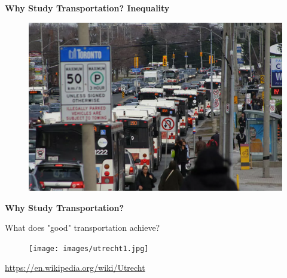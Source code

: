\documentclass[aspectratio=169]{beamer}
\begin{document}


\begin{frame}
	\textbf{Why Study Transportation? Inequality}
	\begin{figure}
		\centering
		\includegraphics[width=0.8\linewidth]{images/ttc_traffic.png}
	\end{figure}
\end{frame}



\begin{frame}
	\textbf{Why Study Transportation?}
	
	\vspace{4mm}
	
	What does "good" transportation achieve?
	
	\begin{figure}
		\centering
		\texttt{[image: images/utrecht1.jpg]}
	\end{figure}
	\tiny\url{https://en.wikipedia.org/wiki/Utrecht}
	
\end{frame}

\end{document}

